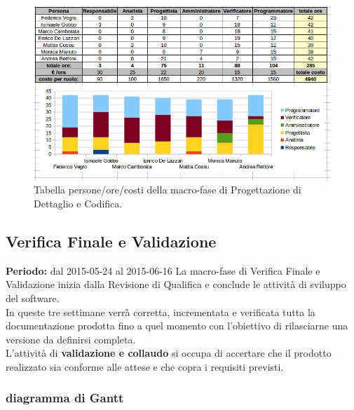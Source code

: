 \begin{figure}[h]
\begin{center}
\includegraphics[scale=0.50]{img/progdet-personeorecosti.png}
\caption{Tabella persone/ore/costi della macro-fase di Progettazione di Dettaglio e Codifica.}
\end{center}
\end{figure}

\newpage
\subsection{Verifica Finale e Validazione}
\textbf{Periodo:} dal 2015-05-24 al 2015-06-16 
La macro-fase di Verifica Finale e Validazione inizia dalla Revisione di Qualifica e conclude le attività di sviluppo del software. \\
In queste tre settimane verrà corretta, incrementata e verificata tutta la documentazione prodotta fino a quel momento con l'obiettivo di rilasciarne una versione da definirsi completa. \\
L'attività di \textbf{validazione e collaudo} si occupa di accertare che il prodotto realizzato sia conforme alle attese e che copra i requisiti previsti. \\

\newpage
\subsubsection{diagramma di Gantt}

